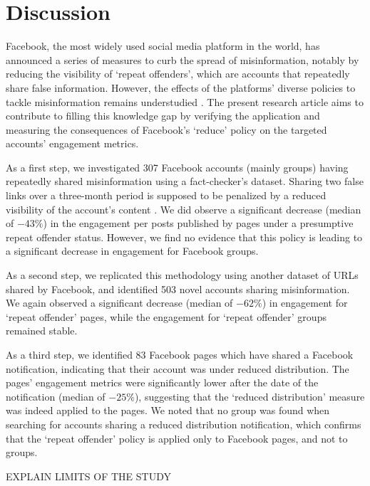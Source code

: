\documentclass[review]{elsarticle}
\begin{document}
{\section{Discussion}

Facebook, the most widely used social media platform in the world, has announced a series of measures to curb the spread of misinformation, notably by reducing the visibility of `repeat offenders', which are accounts that repeatedly share false information. 
However, the effects of the platforms' diverse policies to tackle misinformation remains understudied \citep{pasquetto2020tackling}. 
The present research article aims to contribute to filling this knowledge gap by verifying the application and measuring the consequences of Facebook's `reduce' policy on the targeted accounts' engagement metrics.

As a first step, we investigated 307 Facebook accounts (mainly groups) having repeatedly shared misinformation using a fact-checker's dataset. 
Sharing two false links over a three-month period is supposed to be penalized by a reduced visibility of the account's content \cite{2strikes90daysRule}. 
We did observe a significant decrease (median of $-43\%$) in the engagement per posts published by pages under a presumptive repeat offender status.
However, we find no evidence that this policy is leading to a significant decrease in engagement for Facebook groups.

As a second step, we replicated this methodology using another dataset of URLs shared by Facebook, and identified 503 novel accounts sharing misinformation. 
We again observed a significant decrease (median of $-62\%$) in engagement for `repeat offender' pages, while the engagement for `repeat offender' groups remained stable.
 
As a third step, we identified 83 Facebook pages which have shared a Facebook notification, indicating that their account was under reduced distribution.
The pages' engagement metrics were significantly lower after the date of the notification (median of $-25\%$), suggesting that the `reduced distribution' measure was indeed applied to the pages.
We noted that no group was found when searching for accounts sharing a reduced distribution notification, which confirms that the `repeat offender' policy is applied only to Facebook pages, and not to groups.

{\color{red} EXPLAIN LIMITS OF THE STUDY}

}
\end{document}
